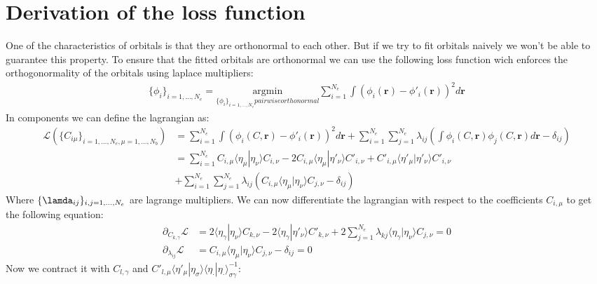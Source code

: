 \section{Derivation of the loss function}
One of the characteristics of orbitals is that they are orthonormal to each other. But if we try to fit orbitals naively we won't be able to guarantee this property. To ensure that the fitted orbitals are orthonormal we can use the following loss function wich enforces the orthogonormality of the orbitals using laplace multipliers:
\begin{align}
    \{\phi_i\}_{i=1,...,N_e} = \underset{\{\phi_i\}_{i=1,...,N_e} pairwise orthonormal}{\text{argmin}}\sum\limits_{i=1}^{N_e} \int (\phi_i(\mathbf{r})-\phi'_i(\mathbf{r}))^2 d\mathbf{r}
\end{align}
In components we can define the lagrangian as:
\begin{align}
\mathcal{L}(\{C_{i\mu}\}_{i=1,...,N_e,\mu=1,...,N_b}) &= \sum\limits_{i=1}^{N_e} \int (\phi_i(C,\mathbf{r})-\phi'_i(\mathbf{r}))^2 d\mathbf{r} + \sum\limits_{i=1}^{N_e} \sum\limits_{j=1}^{N_e} \lambda_{ij}\left( \int \phi_i(C,\mathbf{r})\phi_j(C,\mathbf{r}) d\mathbf{r}- \delta_{ij}\right)\\
    &= \sum\limits_{i=1}^{N_e} C_{i,\mu} \langle \eta_\mu|\eta_\nu \rangle C_{i,\nu} - 2 C_{i,\mu} \langle \eta_\mu|\eta'_\nu \rangle C'_{i,\nu} + C'_{i,\mu} \langle \eta'_\mu|\eta'_\nu \rangle C'_{i,\nu}\\
    &+ \sum\limits_{i=1}^{N_e} \sum\limits_{j=1}^{N_e} \lambda_{ij}\left( C_{i,\mu} \langle \eta_\mu|\eta_\nu \rangle  C_{j,\nu} - \delta_{ij}\right)
\end{align}
Where $\{\lamda_{ij}\}_{i,j=1,...,N_e}$ are lagrange multipliers.
We can now differentiate the lagrangian with respect to the coefficients $C_{i,\mu}$ to get the following equation:
\begin{align}
    \partial_{C_{k,\gamma}}\mathcal{L} &= 2\langle \eta_\gamma|\eta_\nu \rangle C_{k,\nu} - 2 \langle \eta_\gamma|\eta'_\nu \rangle C'_{k,\nu} + 2 \sum\limits_{j=1}^{N_e} \lambda_{kj} \langle \eta_\gamma|\eta_\nu \rangle  C_{j,\nu} = 0\label{deriv_eq}\\
    \partial_{\lambda_{ij}}\mathcal{L} &= C_{i,\mu} \langle \eta_\mu|\eta_\nu \rangle  C_{j,\nu} - \delta_{ij} = 0
\end{align}
Now we contract it with $C_{l,\gamma}$ and $C'_{l,\mu} \langle \eta'_\mu|\eta_\sigma \rangle\langle \eta_\cdot|\eta_\cdot \rangle^{-1}_{\sigma\gamma}$:
